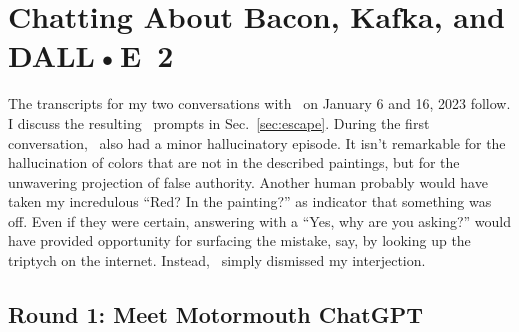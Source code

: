 
\section{Chatting About Bacon, Kafka, and DALL•E~2}
\label{app:chatgpt}

The transcripts for my two conversations with \ChatGPT\ on January 6 and 16,
2023 follow. I discuss the resulting \DALLE\ prompts in Sec.~\ref{sec:escape}.
During the first conversation, \ChatGPT\ also had a minor hallucinatory episode.
It isn't remarkable for the hallucination of colors that are not in the
described paintings, but for the unwavering projection of false authority.
Another human probably would have taken my incredulous ``Red? In the painting?''
as indicator that something was off. Even if they were certain, answering with a
``Yes, why are you asking?'' would have provided opportunity for surfacing the
mistake, say, by looking up the triptych on the internet. Instead, \ChatGPT\
simply dismissed my interjection.


\subsection{Round 1: Meet Motormouth ChatGPT}

